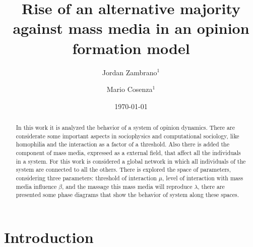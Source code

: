\documentclass[%
 reprint,
 amsmath,amssymb,
 aps,
]{revtex4-2}
\begin{document}

\title{Rise of an alternative majority against mass media in an opinion formation model}%

\author{Jordan Zambrano$^{1}$}
\author{Mario Cosenza$^{1}$}





\date{\today}%

\begin{abstract}
In this work it is analyzed the behavior of a system of opinion dynamics. There are considerate some important aspects in sociophysics and computational sociology, like homophilia and the interaction as a factor of a threshold. Also there is added the component of mass media, expressed as a external field, that affect all the individuals in a system. For this work is considered a global network in which all individuals of the system are connected to all the others. There is explored the space of parameters, considering three parameters: threshold of interaction $\mu$, level of interaction with mass media influence $\beta$, and the massage this mass media will reproduce $\lambda$, there are presented some phase diagrams that show the behavior of system along these spaces.

\end{abstract}

\maketitle


\section{Introduction }



\end{document}
